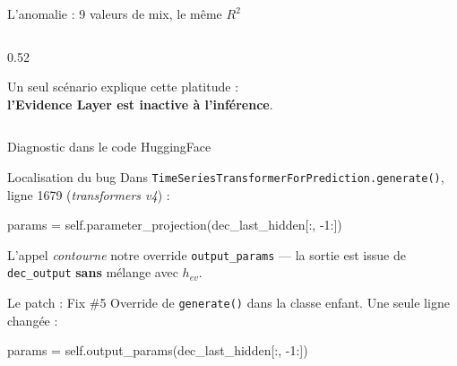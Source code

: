 \documentclass[10pt]{beamer}
\begin{document}
\begin{frame}{L'anomalie : 9 valeurs de mix, le même $R^2$}
\begin{columns}
\begin{column}{0.52\textwidth}
      \vspace{4pt}
      \begin{verdictbox}
        \centering\footnotesize
        Un seul scénario explique cette platitude :\\
        \textbf{l'Evidence Layer est inactive à l'inférence}.
      \end{verdictbox}
    \end{column}
  \end{columns}
\end{frame}

\begin{frame}[fragile]{Diagnostic dans le code HuggingFace}
  \begin{block}{Localisation du bug}
    \footnotesize
    Dans \texttt{TimeSeriesTransformerForPrediction.generate()}, ligne 1679 (\textit{transformers v4}) :

    \vspace{4pt}
    \begin{semiverbatim}
      \footnotesize
      params = self.\textcolor{failure}{parameter\_projection}(dec\_last\_hidden[:, -1:])
    \end{semiverbatim}

    \vspace{4pt}
    L'appel \emph{contourne} notre override \texttt{output\_params} --- la sortie est issue de \texttt{dec\_output} \textbf{sans} mélange avec $h_{ev}$.
  \end{block}

  \begin{exampleblock}{Le patch : Fix \#5}
    \footnotesize
    Override de \texttt{generate()} dans la classe enfant. \alert{Une seule ligne changée} :

    \vspace{4pt}
    \begin{semiverbatim}
      \footnotesize
      params = self.\textcolor{success}{output\_params}(dec\_last\_hidden[:, -1:])
    \end{semiverbatim}
  \end{exampleblock}
\end{frame}
\end{document}

